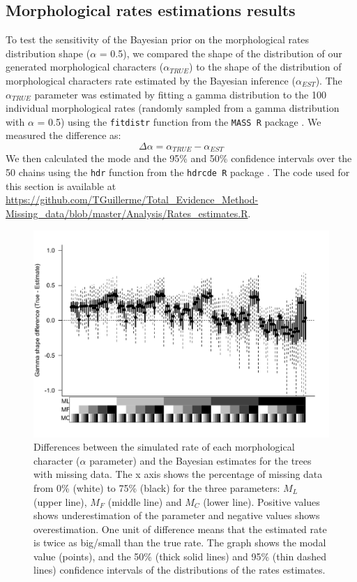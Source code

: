 \documentclass[12pt,letterpaper]{article}
\begin{document}
\subsection{Morphological rates estimations results}
To test the sensitivity of the Bayesian prior on the morphological rates distribution shape ($\alpha$ = 0.5), we compared the shape of the distribution of our generated morphological characters ($\alpha_{TRUE}$) to the shape of the distribution of morphological characters rate estimated by the Bayesian inference ($\alpha_{EST}$).
The $\alpha_{TRUE}$ parameter was estimated by fitting a gamma distribution to the 100 individual morphological rates (randomly sampled from a gamma distribution with $\alpha$ = 0.5) using the \texttt{fitdistr} function from the \texttt{MASS R} package \citep{MASS}.
We measured the difference as:
\begin{equation}
\Delta\alpha=\alpha_{TRUE} - \alpha_{EST}
\end{equation}
We then calculated the mode and the 95\% and 50\% confidence intervals over the 50 chains using the \texttt{hdr} function from the \texttt{hdrcde R} package \citep{hdrcde}.
The code used for this section is available at \url{https://github.com/TGuillerme/Total_Evidence_Method-Missing_data/blob/master/Analysis/Rates_estimates.R}.

\begin{figure}
\centering
\includegraphics[width=\textwidth,keepaspectratio]{SupplementaryFigures/Rates_estimates.pdf}
\caption{Differences between the simulated rate of each morphological character ($\alpha$ parameter) and the Bayesian estimates for the trees with missing data. The x axis shows the percentage of missing data from 0\% (white) to 75\% (black) for the three parameters: $M_{L}$ (upper line), $M_{F}$ (middle line) and $M_{C}$ (lower line). Positive values shows underestimation of the parameter and negative values shows overestimation. One unit of difference means that the estimated rate is twice as big/small than the true rate. The graph shows the modal value (points), and the 50\% (thick solid lines) and 95\% (thin dashed lines) confidence intervals of the distributions of the rates estimates.}
\label{Fig_AppendixCharacters}
\end{figure}
\end{document}
